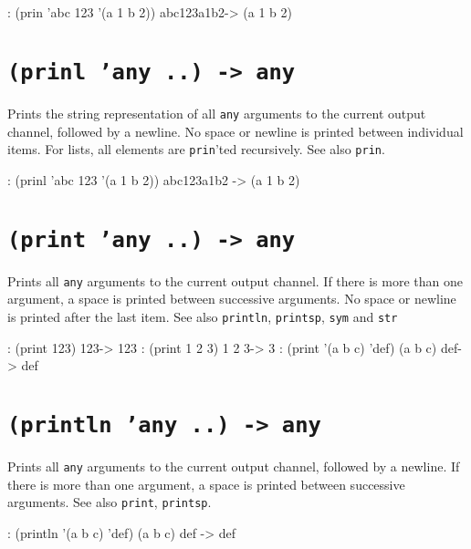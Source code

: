 \begin{wideverbatim}
: (prin 'abc 123 '(a 1 b 2))
abc123a1b2-> (a 1 b 2)
\end{wideverbatim}

 
\section*{\texttt{(prinl 'any ..) -> any}}
\label{sec:func-ref-P-(prinl 'any ..) -> any}


Prints the string representation of all \texttt{any} arguments to the current
output channel, followed by a newline. No space or newline is printed
between individual items. For lists, all elements are \texttt{prin}'ted
recursively. See also \texttt{prin}.


\begin{wideverbatim}
: (prinl 'abc 123 '(a 1 b 2))
abc123a1b2
-> (a 1 b 2)
\end{wideverbatim}

 
\section*{\texttt{(print 'any ..) -> any}}
\label{sec:func-ref-P-(print 'any ..) -> any}


Prints all \texttt{any} arguments to the current output channel. If there is
more than one argument, a space is printed between successive arguments.
No space or newline is printed after the last item. See also \texttt{println},
\texttt{printsp}, \texttt{sym} and \texttt{str}


\begin{wideverbatim}
: (print 123)
123-> 123
: (print 1 2 3)
1 2 3-> 3
: (print '(a b c) 'def)
(a b c) def-> def
\end{wideverbatim}

 
\section*{\texttt{(println 'any ..) -> any}}
\label{sec:func-ref-P-(println 'any ..) -> any}


Prints all \texttt{any} arguments to the current output channel, followed by a
newline. If there is more than one argument, a space is printed between
successive arguments. See also \texttt{print}, \texttt{printsp}.


\begin{wideverbatim}
: (println '(a b c) 'def)
(a b c) def
-> def
\end{wideverbatim}

